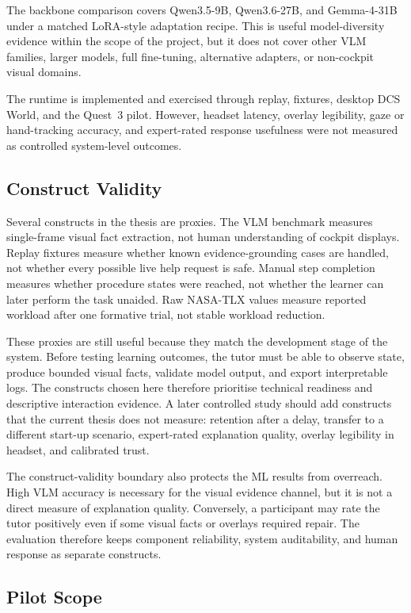 The backbone comparison covers Qwen3.5-9B, Qwen3.6-27B, and Gemma-4-31B under a
matched LoRA-style adaptation recipe. This is useful model-diversity evidence
within the scope of the project, but it does not cover other VLM families,
larger models, full fine-tuning, alternative adapters, or non-cockpit visual
domains.

The runtime is implemented and exercised through replay, fixtures, desktop DCS World,
and the Quest~3 pilot. However, headset latency, overlay legibility, gaze or
hand-tracking accuracy, and expert-rated response usefulness were not measured
as controlled system-level outcomes.

\subsection{Construct Validity}

Several constructs in the thesis are proxies. The VLM benchmark measures
single-frame visual fact extraction, not human understanding of cockpit
displays. Replay fixtures measure whether known evidence-grounding cases are
handled, not whether every possible live help request is safe. Manual step
completion measures whether procedure states were reached, not whether the
learner can later perform the task unaided. Raw NASA-TLX values measure
reported workload after one formative trial, not stable workload reduction.

These proxies are still useful because they match the development stage of the
system. Before testing learning outcomes, the tutor must be able to observe
state, produce bounded visual facts, validate model output, and export
interpretable logs. The constructs chosen here therefore prioritise technical
readiness and descriptive interaction evidence. A later controlled study should
add constructs that the current thesis does not measure: retention after a
delay, transfer to a different start-up scenario, expert-rated explanation
quality, overlay legibility in headset, and calibrated trust.

The construct-validity boundary also protects the ML results from overreach.
High VLM accuracy is necessary for the visual evidence channel, but it is not a
direct measure of explanation quality. Conversely, a participant may rate the
tutor positively even if some visual facts or overlays required repair. The
evaluation therefore keeps component reliability, system auditability, and
human response as separate constructs.

\subsection{Pilot Scope}

